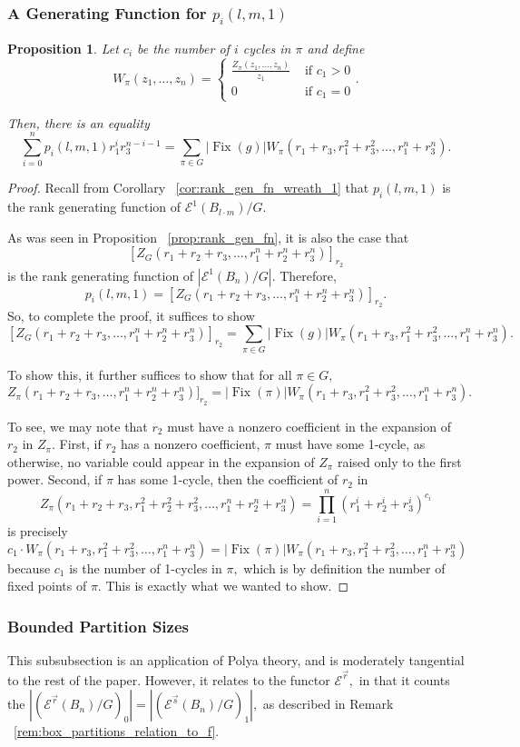 \documentclass[10 pt]{amsart}
\theoremstyle{plain}
\newtheorem{prop}[thm]{Proposition}
\theoremstyle{definition}
\theoremstyle{remark}
\numberwithin{equation}{section}
\newcommand\sssec{\subsubsection}
\renewcommand{\vec}[1]{\overrightarrow{#1}}
\def\Fix{\operatorname{Fix}}
\begin{document}
\sssec{A Generating Function for $p_i(l,m,1)$}

\begin{prop}
Let $c_i$ be the number of $i$ cycles in $\pi$ and define $$W_\pi(z_1,\ldots, z_n) = \begin{cases}\frac {Z_\pi(z_1,\ldots,z_n)}{z_1} &\text{ if } c_1 > 0 \\
0 &\text{ if } c_1 = 0
\end{cases}.$$

Then, there is an equality
$$\sum_{i=0}^n p_i(l,m,1) r_1^ir_3^{n-i-1} = \sum_{\pi \in G} |\Fix(g)|W_\pi(r_1 + r_3,r_1^2+r_3^2,\ldots,r_1^n + r_3^n).$$
\end{prop}
\begin{proof}
Recall from Corollary ~\ref{cor:rank_gen_fn_wreath_1} that $p_i(l,m,1)$ is the rank generating function of $\mathcal E^1(B_{l\cdot m})/G$. 

As was seen in Proposition ~\ref{prop:rank_gen_fn}, it is also the case that $$[Z_G(r_1+r_2+r_3,\ldots, r_1^n+r_2^n+r_3^n)]_{r_2}$$ is the rank generating function of $|\mathcal E^{1}(B_n)/G|.$
Therefore, 
$$p_i(l,m,1)=[Z_G(r_1+r_2 + r_3,\ldots, r_1^n+ r_2^n + r_3^n)]_{r_2}.$$
So, to complete the proof, it suffices to show
$$[Z_G(r_1+r_2 + r_3,\ldots, r_1^n+ r_2^n + r_3^n)]_{r_2} = \sum_{\pi \in G} |\Fix(g)|W_\pi(r_1 + r_3,r_1^2+r_3^2,\ldots,r_1^n + r_3^n).$$

To show this, it further suffices to show that for all $\pi \in G,$
$$Z_\pi(r_1+r_2 + r_3,\ldots, r_1^n+ r_2^n + r_3^n)]_{r_2} =  |\Fix(\pi)|W_\pi(r_1 + r_3,r_1^2+r_3^2,\ldots,r_1^n + r_3^n).$$

To see, we may note that $r_2$ must have a nonzero coefficient in the expansion of $r_2$ in $Z_\pi.$ First, if $r_2$ has a nonzero coefficient, $\pi$ must have some 1-cycle, as otherwise, no variable could appear in the expansion of $Z_\pi$ raised only to the first power. Second, if $\pi$ has some 1-cycle, then the coefficient of $r_2$ in $$Z_\pi(r_1 + r_2+r_3,r_1^2+r_2^2+r_3^2,\ldots,r_1^n + r_2^n+r_3^n) = \prod_{i=1}^n (r_1^i+r_2^i+r_3^i)^{c_i}$$ is precisely 
$$c_1 \cdot W_\pi(r_1 + r_3,r_1^2+r_3^2,\ldots,r_1^n + r_3^n) = |\Fix(\pi)|W_\pi(r_1 + r_3,r_1^2+r_3^2,\ldots,r_1^n + r_3^n)$$ because $c_1$ is the number of 1-cycles in $\pi,$ which is by definition the number of fixed points of $\pi.$ This is exactly what we wanted to show.
\end{proof}

\sssec{Bounded Partition Sizes}
This subsubsection is an application of Polya theory, and is moderately tangential to the rest of the paper. However, it relates to the functor $\mathcal E^{\vec r},$ in that it counts the $|(\mathcal E^{\vec r}(B_n)/G)_0| =  |(\mathcal E^{\vec s}(B_n)/G)_1|,$ as described in Remark ~\ref{rem:box_partitions_relation_to_f}.
\end{document}

